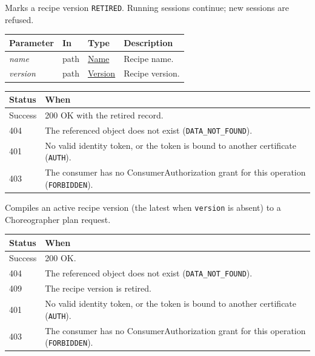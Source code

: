 \documentclass[a4paper]{arrowhead}
\newcommand{\fparam}[1]{\textit{\textcolor{ArrowheadBlue}{#1}}}
\newcommand{\pref}[1]{{\textcolor{ArrowheadGrey}{\hyperref[sec:model:primitives:#1]{#1}}}}
\begin{document}
Marks a recipe version \texttt{RETIRED}. Running sessions continue; new sessions are refused.

{\small
\begin{longtable}{|p{3.0cm}|p{1.4cm}|p{3.2cm}|p{8.2cm}|}

\hline
\rowcolor{gray!33} Parameter & In & Type & Description \\ \hline
\endhead
\fparam{name} & path & \pref{Name} & Recipe name. \\ \hline
\fparam{version} & path & \pref{Version} & Recipe version. \\ \hline
\end{longtable}
}


{\small
\begin{longtable}{|p{2.0cm}|p{13.8cm}|}

\hline
\rowcolor{gray!33} Status & When \\ \hline
\endhead
Success & 200 OK with the retired record. \\ \hline
404 & The referenced object does not exist (\texttt{DATA\_\allowbreak{}NOT\_\allowbreak{}FOUND}). \\ \hline
401 & No valid identity token, or the token is bound to another certificate (\texttt{AUTH}). \\ \hline
403 & The consumer has no ConsumerAuthorization grant for this operation (\texttt{FORBIDDEN}). \\ \hline
\end{longtable}
}

Compiles an active recipe version (the latest when \texttt{version} is absent) to a Choreographer plan request.

{\small
\begin{longtable}{|p{2.0cm}|p{13.8cm}|}

\hline
\rowcolor{gray!33} Status & When \\ \hline
\endhead
Success & 200 OK. \\ \hline
404 & The referenced object does not exist (\texttt{DATA\_\allowbreak{}NOT\_\allowbreak{}FOUND}). \\ \hline
409 & The recipe version is retired. \\ \hline
401 & No valid identity token, or the token is bound to another certificate (\texttt{AUTH}). \\ \hline
403 & The consumer has no ConsumerAuthorization grant for this operation (\texttt{FORBIDDEN}). \\ \hline
\end{longtable}
}
\end{document}
